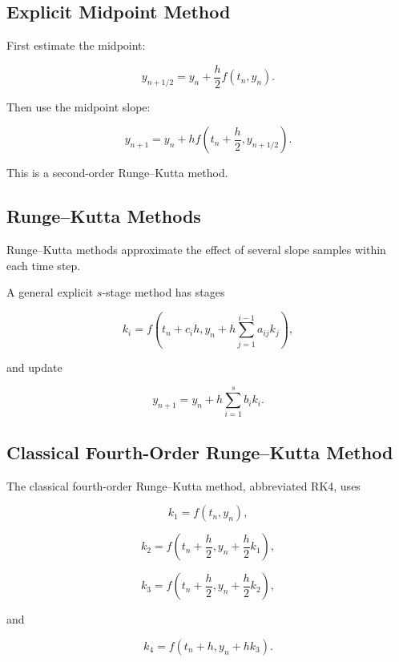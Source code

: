 \subsection{Explicit Midpoint Method}
\label{subsec:explicit-midpoint}

First estimate the midpoint:

\[
\boxed{
y_{n+1/2}
=
y_n
+
\frac{h}{2}
f(t_n,y_n).
}
\]

Then use the midpoint slope:

\[
\boxed{
y_{n+1}
=
y_n
+
h
f
\left(
t_n+\frac{h}{2},
y_{n+1/2}
\right).
}
\]

This is a second-order Runge--Kutta method.

\subsection{Runge--Kutta Methods}
\label{subsec:runge-kutta-methods}

Runge--Kutta methods approximate the effect of several slope samples within
each time step.

A general explicit \(s\)-stage method has stages

\[
\boxed{
k_i
=
f
\left(
t_n+c_ih,
y_n
+
h
\sum_{j=1}^{i-1}
a_{ij}k_j
\right),
}
\]

and update

\[
\boxed{
y_{n+1}
=
y_n
+
h
\sum_{i=1}^{s}
b_ik_i.
}
\]

\subsection{Classical Fourth-Order Runge--Kutta Method}
\label{subsec:rk4}

The classical fourth-order Runge--Kutta method, abbreviated RK4, uses

\[
\boxed{
k_1
=
f(t_n,y_n),
}
\]

\[
\boxed{
k_2
=
f
\left(
t_n+\frac{h}{2},
y_n+\frac{h}{2}k_1
\right),
}
\]

\[
\boxed{
k_3
=
f
\left(
t_n+\frac{h}{2},
y_n+\frac{h}{2}k_2
\right),
}
\]

and

\[
\boxed{
k_4
=
f
(
t_n+h,
y_n+hk_3
).
}
\]

